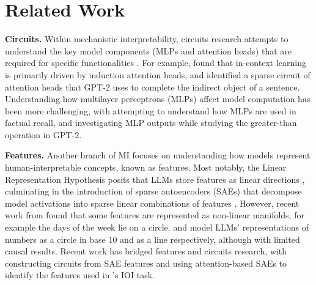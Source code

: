 \section{Related Work}
\textbf{Circuits.} Within mechanistic interpretability, circuits research attempts to understand the key model components (MLPs and attention heads) that are required for specific functionalities \cite{ olah2020zoom, elhage2021mathematical}. For example, \citet{olsson2022context} found that in-context learning is primarily driven by induction attention heads, and \citet{wang2023interpretability} identified a sparse circuit of attention heads that GPT-2 uses to complete the indirect object of a sentence. Understanding how multilayer perceptrons (MLPs) affect model computation has been more challenging, with \citet{nanda2023factfinding} attempting to understand how MLPs are used in factual recall, and \citet{hanna2023how} investigating MLP outputs while studying the greater-than operation in GPT-2.


\textbf{Features.} Another branch of MI focuses on understanding how models represent human-interpretable concepts, known as features. Most notably, the Linear Representation Hypothesis posits that LLMs store features as linear directions \cite{park2023the, elhage2022superposition}, culminating in the introduction of sparse autoencoders (SAEs) that decompose model activations into sparse linear combinations of features \cite{huben2024sparse, bricken2023monosemanticity, templeton2024scaling, gao2024scalingevaluatingsparseautoencoders, rajamanoharan2024improvingdictionarylearninggated}. However, recent work from \citet{engels2024languagemodelfeatureslinear} found that some features are represented as non-linear manifolds, for example the days of the week lie on a circle. \citet{levy2024languagemodelsencodenumbers} and \citet{zhu-etal-2025-language} model LLMs' representations of numbers as a circle in base 10 and as a line respectively, although with limited causal results. Recent work has bridged features and circuits research, with \citet{marks2024sparsefeaturecircuitsdiscovering} constructing circuits from SAE features and \citet{makelov2024towards} using attention-based SAEs to identify the features used in \citet{wang2023interpretability}'s IOI task.

